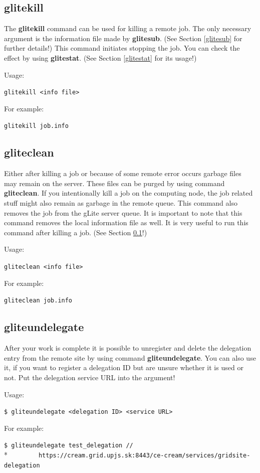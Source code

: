 \documentclass{article}
\begin{document}
\subsection{glitekill}
\label{glitekill}
The \textbf{glitekill} command can be used for killing a remote job. The only necessary argument is the information file made by \textbf{glitesub}. (See Section \ref{glitesub} for further details!) This command initiates stopping the job. You can check the effect by using \textbf{glitestat}. (See Section \ref{glitestat} for its usage!)\par
Usage:
\begin{shaded}\verb#glitekill <info file>#\end{shaded}
For example:
\begin{shaded}\verb#glitekill job.info#\end{shaded}
\subsection{gliteclean}
\label{gliteclean}
Either after killing a job or because of some remote error occurs garbage files may remain on the server. These files can be purged by using command \textbf{gliteclean}. If you intentionally kill a job on the computing node, the job related stuff might also remain as garbage in the remote queue. This command also removes the job from the gLite server queue. It is important to note that this command removes the local information file as well. It is very useful to run this command after killing a job. (See Section \ref{glitekill}!)\par
Usage:
\begin{shaded}\verb#gliteclean <info file>#\end{shaded}
For example:
\begin{shaded}\verb#gliteclean job.info#\end{shaded}
\subsection{gliteundelegate}
\label{gliteundelegate}
After your work is complete it is possible to unregister and delete the delegation entry from the remote site by using command \textbf{gliteundelegate}. You can also use it, if you want to register a delegation ID but are unsure whether it is used or not. Put the delegation service URL into the argument!\par
Usage:
\begin{shaded}\verb#$ gliteundelegate <delegation ID> <service URL>#\end{shaded}
For example:
\begin{shaded}\verb#$ gliteundelegate test_delegation //#\\*
\verb#        https://cream.grid.upjs.sk:8443/ce-cream/services/gridsite-delegation#\end{shaded}
\end{document}
